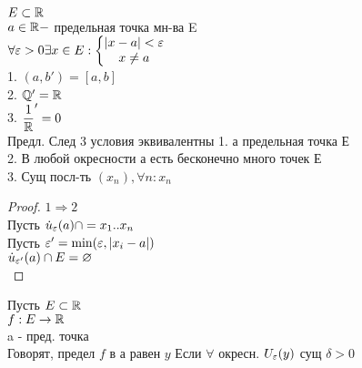 $ E \subset \mathbb{R} $ \\
$ a \in \mathbb{R} - $ предельная точка мн-ва E \\
$ \forall \varepsilon > 0 \exists x \in E : \left\{ \begin{matrix}
|x-a| < \varepsilon \\
x \neq a 
\end{matrix}\right. 
$\\
1. $ (a, b') = [a, b] $ \\
2. $ \mathbb{Q}' =  \mathbb{R} $\\
3. $\dfrac{1}{\mathbb{R}}' = {0} $ \\
Предл. След 3 условия эквивалентны
1. а предельная точка Е \\
2. В любой окресности а есть бесконечно много точек Е \\
3. Сущ посл-ть $(x_n), \forall n : x_n$
\begin{proof}
	$ 1 \Rightarrow 2 $ \\
	Пусть $ \dot{u}_{\varepsilon} (a) \cap = {x_1 .. x_n} $ \\
	Пусть $ \varepsilon' = \min (\varepsilon, |x_i - a | ) $\\
	$ \dot{u}_{\varepsilon'} (a) \cap E = \varnothing $ \\
\end{proof}
Пусть $ E \subset \mathbb{R} $ \\
$ f : E \rightarrow \mathbb{R} $ \\
a - пред. точка \\
Говорят, предел $ f $ в а равен $y$ 
Если $ \forall $ окресн. $ U_{\varepsilon} (y) $ сущ $ \delta > 0 $ \\
